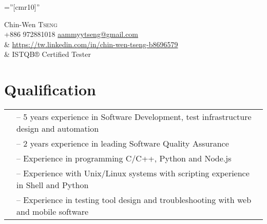 \documentclass[a4paper,pt]{article}
\begin{document}

\pagestyle{empty} %

\font\fb=''[cmr10]'' %

\par{\centering
		{\Huge Chin-Wen \textsc{Tseng}}
		\\ {\small +886 972881018  \href{mailto:aammyytseng@gmail.com}{aammyytseng@gmail.com}} \\&
		\href{https://tw.linkedin.com/in/chin-wen-tseng-b8696579
}{https://tw.linkedin.com/in/chin-wen-tseng-b8696579} \\& ISTQB® Certified Tester 
		\par}

\section{Qualification}

\begin{tabular}{rl}	
 & -- 5  years  experience in Software Development, test infrastructure design and automation\\
  & -- 2  years  experience in leading Software Quality Assurance\\
 & -- Experience in programming C/C++, Python and Node.js \\
 & --  Experience with Unix/Linux systems with scripting experience in Shell and Python
 \\& -- Experience in testing tool design and troubleshooting with web and mobile software
\end{tabular}
\end{document}
